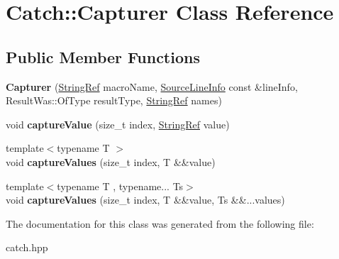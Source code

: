 \hypertarget{classCatch_1_1Capturer}{}\section{Catch\+:\+:Capturer Class Reference}
\label{classCatch_1_1Capturer}
\subsection*{Public Member Functions}
\begin{DoxyCompactItemize}
\item 
{\bfseries Capturer} (\hyperlink{classCatch_1_1StringRef}{String\+Ref} macro\+Name, \hyperlink{structCatch_1_1SourceLineInfo}{Source\+Line\+Info} const \&line\+Info, Result\+Was\+::\+Of\+Type result\+Type, \hyperlink{classCatch_1_1StringRef}{String\+Ref} names)\hypertarget{classCatch_1_1Capturer_a86b0b27acc803a4e1310c10820f3038f}{}\label{classCatch_1_1Capturer_a86b0b27acc803a4e1310c10820f3038f}

\item 
void {\bfseries capture\+Value} (size\+\_\+t index, \hyperlink{classCatch_1_1StringRef}{String\+Ref} value)\hypertarget{classCatch_1_1Capturer_a45e14b9667dc9df7f5132507b322934c}{}\label{classCatch_1_1Capturer_a45e14b9667dc9df7f5132507b322934c}

\item 
{\footnotesize template$<$typename T $>$ }\\void {\bfseries capture\+Values} (size\+\_\+t index, T \&\&value)\hypertarget{classCatch_1_1Capturer_af0810e7f79b197648434d81b492a8c2b}{}\label{classCatch_1_1Capturer_af0810e7f79b197648434d81b492a8c2b}

\item 
{\footnotesize template$<$typename T , typename... Ts$>$ }\\void {\bfseries capture\+Values} (size\+\_\+t index, T \&\&value, Ts \&\&...values)\hypertarget{classCatch_1_1Capturer_a4f79ab493ac2c193a2bb6d49073eb465}{}\label{classCatch_1_1Capturer_a4f79ab493ac2c193a2bb6d49073eb465}

\end{DoxyCompactItemize}


The documentation for this class was generated from the following file\+:\begin{DoxyCompactItemize}
\item 
catch.\+hpp\end{DoxyCompactItemize}
